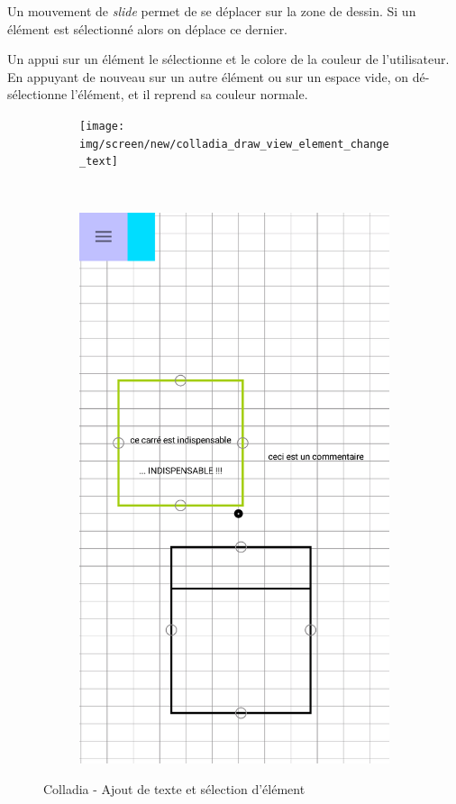 Un mouvement de \textit{slide} permet de se déplacer sur la zone de dessin. Si un élément est sélectionné alors on déplace ce dernier.

Un appui sur un élément le sélectionne et le colore de la couleur de l'utilisateur. En appuyant de nouveau sur un autre élément ou sur un espace vide, on dé-sélectionne l'élément, et il reprend sa couleur normale.

\newpage
		\begin{figure}[!h]
			\centering
			\begin{subfigure}[t]{.27\textwidth}
				\texttt{[image: img/screen/new/colladia\_draw\_view\_element\_change\_text]}
			\end{subfigure}
			~
			\begin{subfigure}[t]{.27\textwidth}
				\includegraphics[width=\textwidth]{img/screen/colladia_draw_view_element_text}
			\end{subfigure}
			\caption{Colladia - Ajout de texte et sélection d'élément}
		\end{figure}
		\vspace*{\fill}
		

